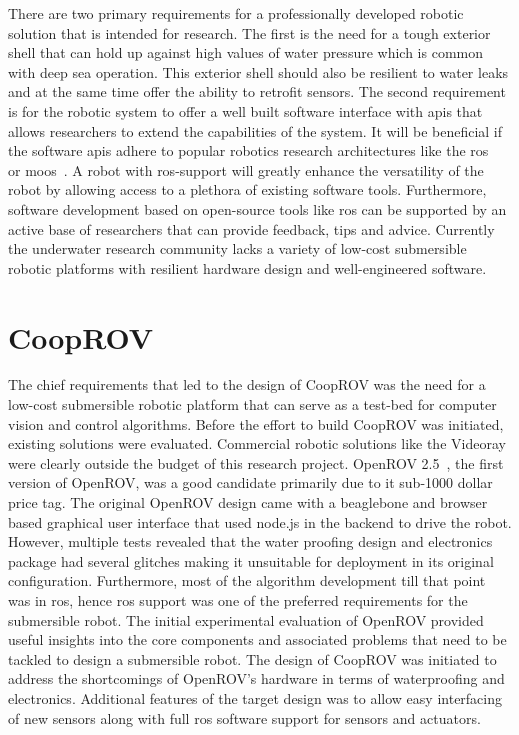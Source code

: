 There are two primary requirements for a professionally developed robotic solution that is intended for research. The first is the need for a tough exterior shell that can hold up against high values of water pressure which is common with deep sea operation. This exterior shell should also be resilient to water leaks and at the same time offer the ability to retrofit sensors. The second requirement is for the robotic system to offer a well built software interface with \gls{api}s that allows researchers to extend the capabilities of the system. It will be beneficial if the software \gls{api}s adhere to popular robotics research architectures like the \gls{ros}~\cite{ros} or \gls{moos}~\cite{moos}. A robot with \gls{ros}-support will greatly enhance the versatility of the robot by allowing access to a plethora of existing software tools. Furthermore, software development based on open-source tools like \gls{ros} can be supported by an active base of researchers that can provide feedback, 
tips and advice. Currently the underwater research community lacks a variety of low-cost submersible 
robotic platforms with resilient hardware design and well-engineered software.

\section{CoopROV}

The chief requirements that led to the design of CoopROV was the need for a low-cost submersible robotic platform that can serve as a test-bed for computer vision and control algorithms. Before the effort to build CoopROV was initiated, existing solutions were evaluated. Commercial robotic solutions like the Videoray were clearly outside the budget of this research project. OpenROV 2.5~\cite{openrov}, the first version of OpenROV, was a good candidate primarily due to it sub-1000 dollar price tag. The original OpenROV design came with a beaglebone and browser based graphical user interface that used node.js \cite{nodejs} in the backend to drive the robot. However, multiple tests revealed that the water proofing design and electronics package had several glitches making it unsuitable for deployment in its original configuration. Furthermore, most of the algorithm development till that point was in \gls{ros}, hence \gls{ros} support was one of the 
preferred requirements for the submersible robot. The initial experimental evaluation of OpenROV provided useful insights into the core components and associated problems that need to be tackled to design a submersible robot. The design of CoopROV was initiated to address the shortcomings of OpenROV's hardware in terms of waterproofing and electronics. Additional features of the target design was to allow easy interfacing of new sensors along with full \gls{ros} software support for sensors and actuators.

